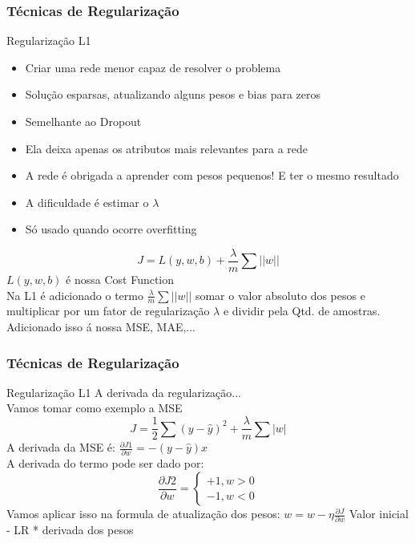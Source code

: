\documentclass{beamer}
\begin{document}
\begin{frame}
	\frametitle{Técnicas de Regularização}
	\begin{block}{Regularização L1}
		\begin{itemize}
			\item Criar uma rede menor capaz de resolver o problema
			\item Solução esparsas, atualizando alguns pesos e bias para zeros
			\item Semelhante ao Dropout
			\item Ela deixa apenas os atributos mais relevantes para a rede
			\item A rede é obrigada a aprender com pesos pequenos! E ter o mesmo resultado
			\item A dificuldade é estimar o $\lambda$
			\item Só usado quando ocorre overfitting
		\end{itemize}
	$$J = L(y, w, b) + \frac{\lambda}{m} \sum ||w||$$
	$L(y, w, b)$ é nossa Cost Function \\
	Na L1 é adicionado o termo $ \frac{\lambda}{m} \sum ||w||$  somar o valor absoluto dos pesos e multiplicar por um fator de regularização $\lambda$ e dividir pela Qtd. de amostras. Adicionado isso á nossa MSE, MAE,...
	\end{block}
\end{frame}
\begin{frame}
	\frametitle{Técnicas de Regularização}
	\begin{block}{Regularização L1}
		A derivada da regularização... \\
		Vamos tomar como exemplo a MSE
		$$J = \frac{1}{2} \sum (y - \hat{y})^2 + \frac{\lambda}{m} \sum |w|$$
		A derivada da MSE é:
		$\frac{\partial J1}{\partial w} = -(y - \hat{y})x$ \\
		A derivada do termo pode ser dado por:
		$$\frac{\partial J2}{\partial w} =  \left\{\begin{matrix}
			+1, w > 0
			\\ 
			-1, w < 0
		\end{matrix}\right.$$
	Vamos aplicar isso na formula de atualização dos pesos:
	$w = w - \eta \frac{\partial J}{\partial w}$ Valor inicial - LR * derivada dos pesos 
	\end{block}
\end{frame}
\end{document}
